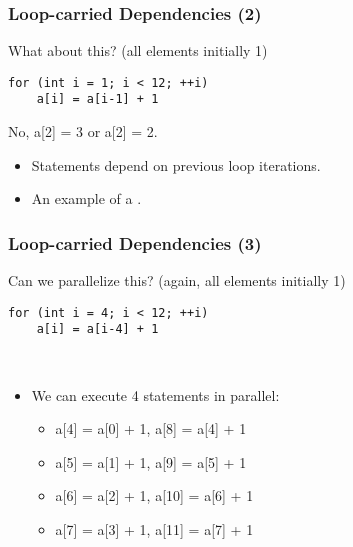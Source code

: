 \documentclass[aspectratio=43]{beamer}
\newenvironment{changemargin}[1]{%
  \begin{list}{}{%
    \setlength{\topsep}{0pt}%
    \setlength{\leftmargin}{#1}%
    \setlength{\rightmargin}{1em}
    \setlength{\listparindent}{\parindent}%
    \setlength{\itemindent}{\parindent}%
    \setlength{\parsep}{\parskip}%
  }%
  \item[]}{\end{list}}
\begin{document}
\begin{frame}[fragile]
\frametitle{Loop-carried Dependencies (2)}
\begin{changemargin}{2.5cm}
What about this? (all elements initially 1)
\begin{lstlisting}
for (int i = 1; i < 12; ++i)
    a[i] = a[i-1] + 1
\end{lstlisting}
\pause
\alert{No, a[2] = 3 or a[2] = 2.}\\[1em]
\begin{itemize}
\item Statements depend on previous loop iterations.
\item An example of a .
\end{itemize}
\end{changemargin}
\end{frame}

\begin{frame}[fragile]
\frametitle{Loop-carried Dependencies (3)}
\begin{changemargin}{2.5cm}
Can we parallelize this? (again, all elements initially 1)
\begin{lstlisting}
for (int i = 4; i < 12; ++i)
    a[i] = a[i-4] + 1
\end{lstlisting}
\pause
{}\\[1em]
\begin{itemize}
\item We can execute 4 statements in parallel:
\begin{itemize}
  \item a[4] = a[0] + 1, a[8] = a[4] + 1
  \item a[5] = a[1] + 1, a[9] = a[5] + 1
  \item a[6] = a[2] + 1, a[10] = a[6] + 1
  \item a[7] = a[3] + 1, a[11] = a[7] + 1
\end{itemize}  
\end{itemize}

\pause
{}
\end{changemargin}
\end{frame}
\end{document}
